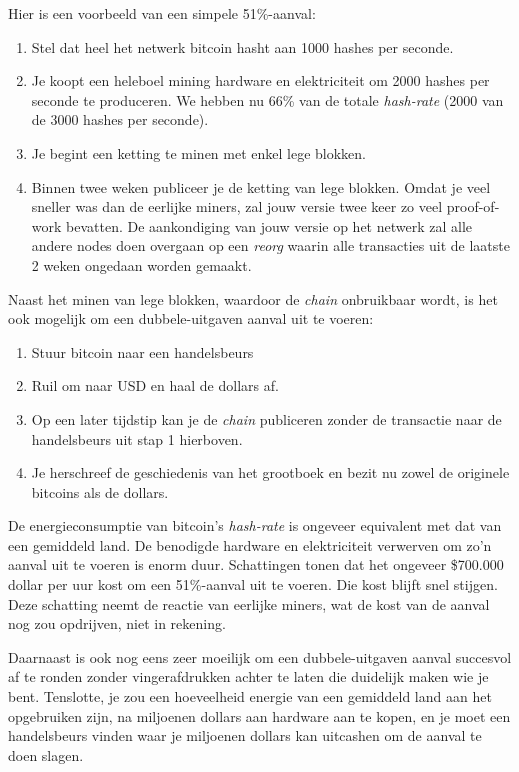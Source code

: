 Hier is een voorbeeld van een simpele 51\%-aanval:

\begin{enumerate}
\item Stel dat heel het netwerk bitcoin hasht aan 1000 hashes per seconde.
\item Je koopt een heleboel mining hardware en elektriciteit om 2000 hashes per seconde te produceren. We hebben nu 66\% van de totale \textit{hash-rate} (2000 van de 3000 hashes per seconde).
\item Je begint een ketting te minen met enkel lege blokken.
\item Binnen twee weken publiceer je de ketting van lege blokken. Omdat je veel sneller was dan de eerlijke miners, zal jouw versie twee keer zo veel proof-of-work bevatten. De aankondiging van jouw versie op het netwerk zal alle andere nodes doen overgaan op een \textit{reorg} waarin alle transacties uit de laatste 2 weken ongedaan worden gemaakt.
\end{enumerate}
Naast het minen van lege blokken, waardoor de \textit{chain} onbruikbaar wordt, is het ook mogelijk om een dubbele-uitgaven aanval uit te voeren:

\begin{enumerate}
\item Stuur bitcoin naar een handelsbeurs
\item Ruil om naar USD en haal de dollars af.
\item Op een later tijdstip kan je de\textit{ chain} publiceren zonder de transactie naar de handelsbeurs uit stap 1 hierboven.
\item Je herschreef de geschiedenis van het grootboek en bezit nu zowel de originele bitcoins als de dollars.
\end{enumerate}
De energieconsumptie van bitcoin’s \textit{hash-rate} is ongeveer equivalent met dat van een gemiddeld land. De benodigde hardware en elektriciteit verwerven om zo’n aanval uit te voeren is enorm duur. Schattingen tonen dat het ongeveer \$700.000 dollar per uur kost om een 51\%-aanval uit te voeren. Die kost blijft snel stijgen. Deze schatting neemt de reactie van eerlijke miners, wat de kost van de aanval nog zou opdrijven, niet in rekening.

Daarnaast is ook nog eens zeer moeilijk om een dubbele-uitgaven aanval succesvol af te ronden zonder vingerafdrukken achter te laten die duidelijk maken wie je bent. Tenslotte, je zou een hoeveelheid energie van een gemiddeld land aan het opgebruiken zijn, na miljoenen dollars aan hardware aan te kopen, en je moet een handelsbeurs vinden waar je miljoenen dollars kan uitcashen om de aanval te doen slagen.

